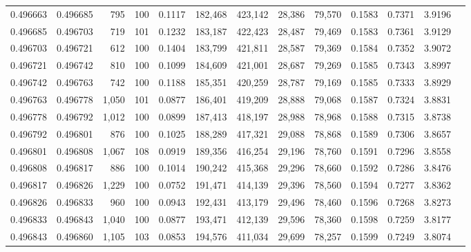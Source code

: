 \begin{tabular}{rrrrrrrrrrrrr}
0.496663 & 0.496685 &   795 & 100 &                                     0.1117 & 182,468 & 423,142 &  28,386 &  79,570 & 0.1583 & 0.7371 & 3.9196 \\
0.496685 & 0.496703 &   719 & 101 &                                     0.1232 & 183,187 & 422,423 &  28,487 &  79,469 & 0.1583 & 0.7361 & 3.9129 \\
0.496703 & 0.496721 &   612 & 100 &                                     0.1404 & 183,799 & 421,811 &  28,587 &  79,369 & 0.1584 & 0.7352 & 3.9072 \\
0.496721 & 0.496742 &   810 & 100 &                                     0.1099 & 184,609 & 421,001 &  28,687 &  79,269 & 0.1585 & 0.7343 & 3.8997 \\
0.496742 & 0.496763 &   742 & 100 &                                     0.1188 & 185,351 & 420,259 &  28,787 &  79,169 & 0.1585 & 0.7333 & 3.8929 \\
0.496763 & 0.496778 & 1,050 & 101 &                                     0.0877 & 186,401 & 419,209 &  28,888 &  79,068 & 0.1587 & 0.7324 & 3.8831 \\
0.496778 & 0.496792 & 1,012 & 100 &                                     0.0899 & 187,413 & 418,197 &  28,988 &  78,968 & 0.1588 & 0.7315 & 3.8738 \\
0.496792 & 0.496801 &   876 & 100 &                                     0.1025 & 188,289 & 417,321 &  29,088 &  78,868 & 0.1589 & 0.7306 & 3.8657 \\
0.496801 & 0.496808 & 1,067 & 108 &                                     0.0919 & 189,356 & 416,254 &  29,196 &  78,760 & 0.1591 & 0.7296 & 3.8558 \\
0.496808 & 0.496817 &   886 & 100 &                                     0.1014 & 190,242 & 415,368 &  29,296 &  78,660 & 0.1592 & 0.7286 & 3.8476 \\
0.496817 & 0.496826 & 1,229 & 100 &                                     0.0752 & 191,471 & 414,139 &  29,396 &  78,560 & 0.1594 & 0.7277 & 3.8362 \\
0.496826 & 0.496833 &   960 & 100 &                                     0.0943 & 192,431 & 413,179 &  29,496 &  78,460 & 0.1596 & 0.7268 & 3.8273 \\
0.496833 & 0.496843 & 1,040 & 100 &                                     0.0877 & 193,471 & 412,139 &  29,596 &  78,360 & 0.1598 & 0.7259 & 3.8177 \\
0.496843 & 0.496860 & 1,105 & 103 &                                     0.0853 & 194,576 & 411,034 &  29,699 &  78,257 & 0.1599 & 0.7249 & 3.8074 \\

\end{tabular}
